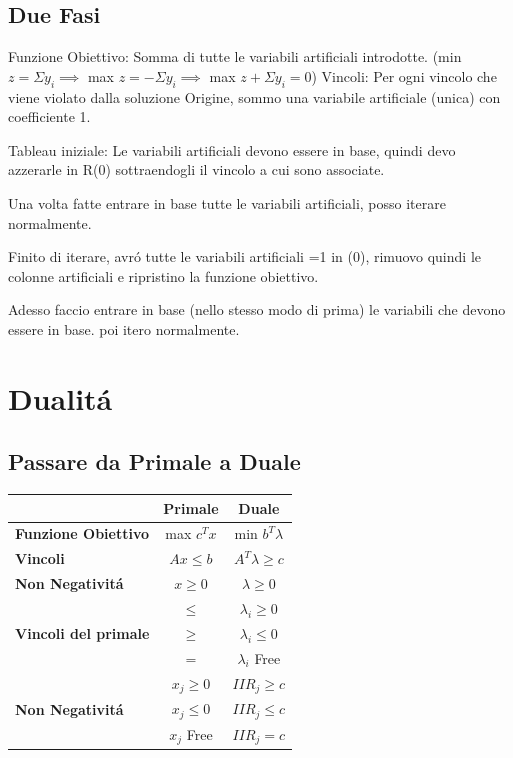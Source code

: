 \documentclass[12pt, a4paper, openany]{book}
\begin{document}
\subsection{Due Fasi}

Funzione Obiettivo: Somma di tutte le variabili artificiali introdotte. (min $z= \Sigma y_i \implies$ max $z= - \Sigma y_i \implies$ max $z+\Sigma y_i = 0$)
Vincoli: Per ogni vincolo che viene violato dalla soluzione Origine, sommo una variabile artificiale (unica) con coefficiente 1.

Tableau iniziale: Le variabili artificiali devono essere in base, quindi devo azzerarle in R(0) sottraendogli il vincolo a cui sono associate.

Una volta fatte entrare in base tutte le variabili artificiali, posso iterare normalmente.

Finito di iterare, avró tutte le variabili artificiali =1 in (0), rimuovo quindi le colonne artificiali e ripristino la funzione obiettivo.

Adesso faccio entrare in base (nello stesso modo di prima) le variabili che devono essere in base. poi itero normalmente.

\section{Dualitá}
\subsection{Passare da Primale a Duale}


\begin{tabularx}{0.7\textwidth}{|X|c|c|}
	\hline
    & \textbf{Primale} & \textbf{Duale}\\
	\hline
    \textbf{Funzione Obiettivo} & max $c^T x$ & min $b^T \lambda$\\
    \hline
	\textbf{Vincoli} & $Ax \leq b$ & $A^T\lambda \geq c$\\
    \hline
	\textbf{Non Negativitá} & $x\geq 0$ & $\lambda \geq 0$\\
	\hline
    \multirow{3}{*}{\textbf{Vincoli del primale}}
    &$\leq$ & $\lambda_i \geq 0$\\
	\cline{2-3}
    &$\geq$ & $\lambda_i \leq 0$\\
	\cline{2-3}
    &$=$ & $\lambda_i$ Free\\
	\hline
    \multirow{3}{*}{\textbf{Non Negativitá}}
    &$x_j \geq 0 $ & $IIR_j \geq c$\\
	\cline{2-3}
    &$x_j \leq 0 $ & $IIR_j \leq c$\\
	\cline{2-3}
    &$x_j$ Free & $IIR_j = c$\\
	\hline
\end{tabularx}
\end{document}
